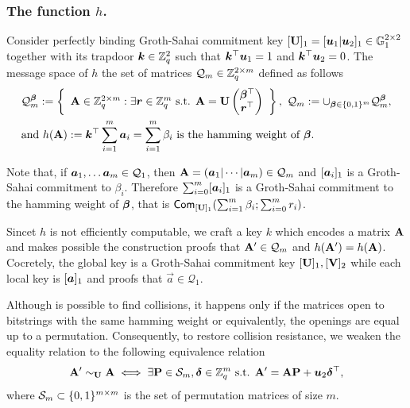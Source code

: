 
\subsubsection{The function $h$.} Consider perfectly binding Groth-Sahai commitment key $[\mathbf{{U}}]_1 = [{\boldsymbol{u}}_1|{\boldsymbol{u}}_2]_1\in\mathbb{G}_1^{2\times 2}$ together with its trapdoor ${\boldsymbol{k}}\in\mathbb{Z}_q^2$ such that ${\boldsymbol{k}}^\top{\boldsymbol{u}}_1 = 1$ and ${\boldsymbol{k}}^\top{\boldsymbol{u}}_2 = 0$. The message space of $h$ the set of matrices $\mathcal{Q}_m\in\mathbb{Z}_q^{2\times m}$ defined as follows
\begin{align*}
&\mathcal{Q}_m^{\boldsymbol{\beta}} := \left\{
\begin{array}{c}
\mathbf{{A}} \in \mathbb{Z}_q^{2\times m}:
\exists {\boldsymbol{r}}\in\mathbb{Z}_q^m\text{ s.t. }
{\mathbf{{A}} = \mathbf{{U}}\left(\begin{matrix}{\boldsymbol{\beta}}^\top\\{\boldsymbol{r}}^\top\end{matrix}\right)
}
\end{array}\right\},
\ \mathcal{Q}_m := \cup_{{\boldsymbol{\beta}}\in\{0,1\}^m} \mathcal{Q}_m^{\boldsymbol{\beta}},\\
&\text{and } h(\mathbf{{A}}):= {\boldsymbol{k}}^\top\sum_{i=1}^m{\boldsymbol{a}}_i = \sum_{i=1}^m \beta_i \text{ is the hamming weight of }{\boldsymbol{\beta}}.
\end{align*}

Note that, if ${\boldsymbol{a}}_1,\ldots {\boldsymbol{a}}_m\in\mathcal{Q}_{1}$, then $\matr{A} = (\vec{a}_1\cat\cdots\cat\vecb{a}_m)\in\mathcal{Q}_{m}$ and $[{\boldsymbol{a}}_i]_1$ is a Groth-Sahai commitment to $\beta_i$.
Therefore $\sum_{i=0}^m[{\boldsymbol{a}}_i]_1$ is a Groth-Sahai commitment to the hamming weight of ${\boldsymbol{\beta}}$, that is $\mathsf{Com}_{[\mathbf{{U}}]_1}(\sum_{i=1}^m \beta_i;\sum_{i=0}^m r_i)$.

Sincet $h$ is not efficiently computable, we craft a key $k$ which encodes a matrix $\mathbf{{A}}$ and makes possible the construction proofs that $\mathbf{{A}}'\in\mathcal{Q}_m$ and $h(\mathbf{{A}}')=h(\mathbf{{A}})$. Cocretely, the global key is a Groth-Sahai commitment key $[\mathbf{{U}}]_1,[\mathbf{{V}}]_2$ while each local key is $[{\boldsymbol{a}}]_1$ and proofs that $\vec{a}\in\mathcal{Q}_1$.

Although is possible to find collisions, it happens only if the matrices open to bitstrings with the same hamming weight or equivalently, the openings are equal up to a permutation. Consequently, to restore collision resistance, we weaken the equality relation to the following equivalence relation
$$
\mathbf{{A}}' \sim_{\mathbf{{U}}} \mathbf{{A}} \iff \exists \mathbf{{P}}\in\mathcal{S}_m, {\boldsymbol{\delta}}\in\mathbb{Z}_q^m \text{ s.t. } \mathbf{{A}}' = \mathbf{{A}}\mathbf{{P}} + {\boldsymbol{u}}_2{\boldsymbol{\delta}}^\top,
$$
where $\mathcal{S}_m\subset \{0,1\}^{m\times m}$ is the set of permutation matrices of size $m$.

